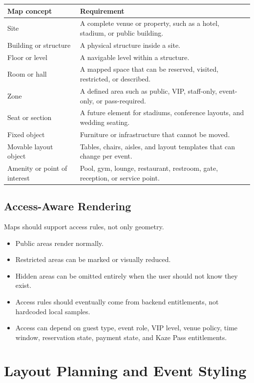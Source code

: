 \documentclass[11pt,a4paper]{article}
\begin{document}
\begin{longtable}{p{} p{}}
\textbf{Map concept} & \textbf{Requirement} \\
\midrule
Site & A complete venue or property, such as a hotel, stadium, or public building. \\
Building or structure & A physical structure inside a site. \\
Floor or level & A navigable level within a structure. \\
Room or hall & A mapped space that can be reserved, visited, restricted, or described. \\
Zone & A defined area such as public, VIP, staff-only, event-only, or pass-required. \\
Seat or section & A future element for stadiums, conference layouts, and wedding seating. \\
Fixed object & Furniture or infrastructure that cannot be moved. \\
Movable layout object & Tables, chairs, aisles, and layout templates that can change per event. \\
Amenity or point of interest & Pool, gym, lounge, restaurant, restroom, gate, reception, or service point. \\
\end{longtable}

\subsection{Access-Aware Rendering}

Maps should support access rules, not only geometry.

\begin{itemize}
    \item Public areas render normally.
    \item Restricted areas can be marked or visually reduced.
    \item Hidden areas can be omitted entirely when the user should not know they exist.
    \item Access rules should eventually come from backend entitlements, not hardcoded local samples.
    \item Access can depend on guest type, event role, VIP level, venue policy, time window, reservation state, payment state, and Kaze Pass entitlements.
\end{itemize}

\section{Layout Planning and Event Styling}
\end{document}
